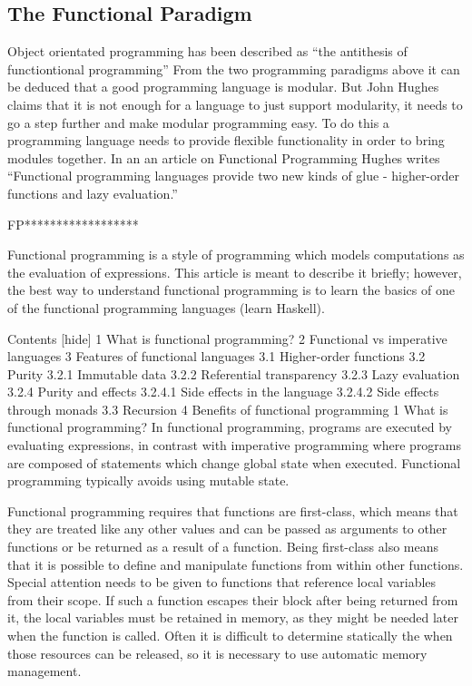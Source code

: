 \documentclass{report}
\begin{document}


\subsection{The Functional Paradigm}
Object orientated programming has been described as ``the antithesis of functiontional programming'' \cite{Taivalsaari1993} From the two programming paradigms above it can be deduced that a good programming language is modular. But John Hughes claims that it is not enough for a language to just support modularity, it needs to go a step further and make modular programming easy. To do this a programming language needs to provide flexible functionality in order to bring modules together. In an an article on Functional Programming Hughes writes ``Functional programming languages provide two new kinds of glue - higher-order functions and lazy evaluation.''\cite{Hughes1984} %

FP******************

Functional programming is a style of programming which models computations as the evaluation of expressions. This article is meant to describe it briefly; however, the best way to understand functional programming is to learn the basics of one of the functional programming languages (learn Haskell).

Contents [hide]
1 What is functional programming?
2 Functional vs imperative languages
3 Features of functional languages
3.1 Higher-order functions
3.2 Purity
3.2.1 Immutable data
3.2.2 Referential transparency
3.2.3 Lazy evaluation
3.2.4 Purity and effects
3.2.4.1 Side effects in the language
3.2.4.2 Side effects through monads
3.3 Recursion
4 Benefits of functional programming
1 What is functional programming?
In functional programming, programs are executed by evaluating expressions, in contrast with imperative programming where programs are composed of statements which change global state when executed. Functional programming typically avoids using mutable state.

Functional programming requires that functions are first-class, which means that they are treated like any other values and can be passed as arguments to other functions or be returned as a result of a function. Being first-class also means that it is possible to define and manipulate functions from within other functions. Special attention needs to be given to functions that reference local variables from their scope. If such a function escapes their block after being returned from it, the local variables must be retained in memory, as they might be needed later when the function is called. Often it is difficult to determine statically the when those resources can be released, so it is necessary to use automatic memory management.
\end{document}

